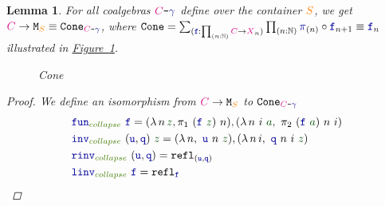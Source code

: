 \documentclass[twoside,11pt,openright]{report}
\theoremstyle{plain} %
\newtheorem{lem}[thm]{Lemma}
\theoremstyle{definition}
\theoremstyle{remark}
\newcommand*{\figref}[1]{\hyperref[fig:#1]{Figure~\ref*{fig:#1}}}
\newcommand*{\term}[1]{\textcolor{green!30!black}{#1}} %
\newcommand*{\pathterm}[1]{\textcolor{green!65!red!75!black}{#1}}
\newcommand*{\type}[1]{\textcolor{magenta!90!black}{#1}}
\newcommand*{\container}[1]{\textcolor{orange}{#1}}
\newcommand*{\coalg}[2]{#1\texttt{-}#2}
\newcommand*{\function}[1]{\textcolor{blue!60!black}{\ensuremath{\mathtt{#1}}}}
\newcommand*{\typeformer}[1]{\ensuremath{\mathtt{#1}}}
\begin{document}
\begin{lem}\label{lem:function-to-M-type-is-cone}
  For all coalgebras \(\coalg{\type{C}}{\function{\gamma}}\) define over the container \(\container{S}\), we get \(\type{C} \rightarrow \typeformer{M}_{\container{S}} \equiv \typeformer{Cone}_{\coalg{\type{C}}{\function{\gamma}}}\), where \(\typeformer{Cone} = \sum_{(\function{f} : \prod_{(n : \mathbb{N})} \type{C} \rightarrow \type{X}_n)} \prod_{(n : \mathbb{N})} \function{\pi}_{(n)} \circ \function{f}_{n+1} \equiv \function{f}_n\) illustrated in \figref{M-seq-cone}.
  \begin{figure}[h]
    \centering
    \caption{Cone}
    \label{fig:M-seq-cone}
  \end{figure}  
  \begin{proof}
    We define an isomorphism from \(\type{C} \rightarrow \typeformer{M}_{\container{S}}\) to \(\typeformer{Cone}_{\coalg{\type{C}}{\function{\gamma}}}\)
    \begin{align}
      &\function{fun}_{\pathterm{collapse}}~\function{f} = (\lambda\,n\,\term{z},\pi_1~(\function{f}~\term{z})~n),(\lambda\,n~i~\term{a},~\pi_2~(\function{f}~\term{a})~n~i) \\
      &\function{inv}_{\pathterm{collapse}}~(\function{u},\function{q})~\term{z} = (\lambda\,n,~\function{u}~n~\term{z}),(\lambda\,n\,i,~\function{q}~n~i~\term{z}) \\
      &\function{rinv}_{\pathterm{collapse}}~(\function{u},\function{q}) = \mathtt{refl}_{(\function{u},\function{q})} \\
      &\function{linv}_{\pathterm{collapse}}~\function{f} = \mathtt{refl}_{\function{f}}
    \end{align}
  \end{proof}
\end{lem}
\end{document}
